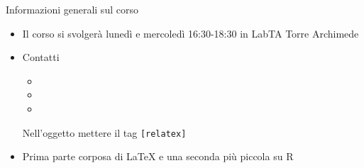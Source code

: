 \begin{frame}{Informazioni generali sul corso}
	\begin{itemize}
		\item Il corso si svolgerà lunedì e mercoledì 16:30-18:30 in LabTA Torre
		Archimede
		\item Contatti 
		\begin{itemize}
			\item {}
			\item {}
			\item {}
		\end{itemize}
		Nell'oggetto mettere il tag \texttt{[relatex]}
		\item Prima parte corposa di \LaTeX{} e una seconda più piccola su R
	\end{itemize}
\end{frame}